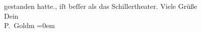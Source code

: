 \begin{ledgroupsized}[t]{13cm}
{{{                  gestanden hatte.}}}\label{K_L03216-22h}, iſt beſſer als das Schillertheater.\pend
           \pstart
           Viele Grüße {\\[\baselineskip]}Dein {\\[\baselineskip]}\spacefill\mbox{P. Goldm}\pend
           \leftskip=0em{}
         
         \endnumbering{}\end{ledgroupsized}  \newcommand{\dateiname}{L03216}\newcommand{\titel}{Paul Goldmann an Arthur Schnitzler, 31. 7. 1902}\newcommand{\editorInnen}{Martin Anton Müller und Laura Untner}
      